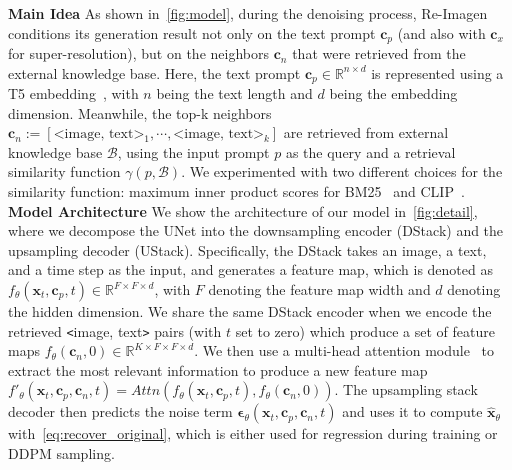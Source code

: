 \documentclass{article} \usepackage{iclr2023_conference,times}
\newcommand{\modelname}{{Re-Imagen}\xspace}
\begin{document}
\noindent \textbf{Main Idea} As shown in~\autoref{fig:model}, during the denoising process, \modelname conditions its generation result not only on the text prompt $\bm{c}_p$ (and also with $\bm{c}_x$ for super-resolution), but on the neighbors $\bm{c}_n$ that were retrieved from the external knowledge base. Here, the text prompt $\bm{c}_p \in \mathbb{R}^{n \times d}$ is represented using a T5 embedding~\citep{raffel2020exploring}, with $n$ being the text length and $d$ being the embedding dimension. Meanwhile, the top-k neighbors $\bm{c}_n:=[\texttt{<}\text{image, text}\texttt{>}_1, \cdots, \texttt{<}\text{image, text}\texttt{>}_k]$ are retrieved from external knowledge base $\mathcal{B}$, using the input prompt $p$ as the query and a retrieval similarity function $\gamma(p, \mathcal{B})$. We experimented with two different choices for the similarity function: maximum inner product scores for BM25~\citep{robertson2009probabilistic} and CLIP~\citep{radford2021learning}. \vspace{1ex} \\
\noindent \textbf{Model Architecture} We show the architecture of our model in~\autoref{fig:detail}, where we decompose the UNet into the downsampling encoder (DStack) and the upsampling decoder (UStack). Specifically, the DStack takes an image, a text, and a time step as the input, and generates a feature map, which is denoted as $f_{\theta}(\bm{x}_t, \bm{c}_p, t) \in \mathbb{R}^{F \times F \times d}$, with $F$ denoting the feature map width and $d$ denoting the hidden dimension. We share the same DStack encoder when we encode the retrieved \texttt{<}image, text\texttt{>} pairs (with $t$ set to zero) which produce a set of feature maps $f_{\theta}(\bm{c}_n, 0) \in \mathbb{R}^{K \times F \times F \times d}$. We then use a multi-head attention module~\citep{vaswani2017attention} to extract the most relevant information to produce a new feature map $f'_{\theta}(\bm{x}_t, \bm{c}_p, \bm{c}_n, t) = Attn(f_{\theta}(\bm{x}_t, \bm{c}_p, t), f_{\theta}(\bm{c}_n, 0))$. The upsampling stack decoder then predicts the noise term $\bm{\epsilon}_{\theta}(\bm{x}_{t}, \bm{c}_p, \bm{c}_n, t)$ and uses it to compute $\hat{\bm{x}}_{\theta}$ with~\autoref{eq:recover_original}, which is either used for regression during training or DDPM sampling. \vspace{1ex} \\
\end{document}
